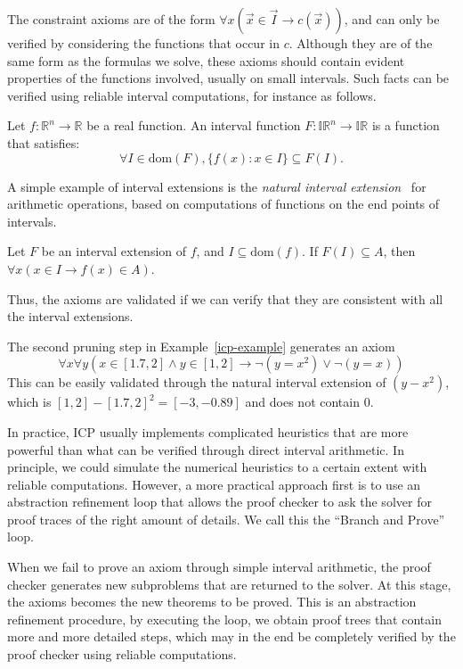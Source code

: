 \documentclass[envcountsect]{llncs}
\newcommand{\dom}{\mathrm{dom}}
\begin{document}
The constraint axioms are of the form $\forall x (\vec x\in \vec I \rightarrow
c(\vec x))$, and can only be verified by considering the functions that
occur in $c$. Although they are of the same form as the formulas we solve,
these axioms should contain evident properties of the functions involved,
usually on small intervals. Such facts can be verified using reliable interval
computations, for instance as follows. 
\begin{definition}
Let $f: \mathbb{R}^n\rightarrow \mathbb{R}$ be a real function. An interval
function $F: \mathbb{IR}^n \rightarrow \mathbb{IR}$ is a function that
satisfies:
$$\forall I\in \dom(F), \{f(x): x\in I\}\subseteq F(I).$$
\end{definition}
A simple example of interval extensions is the {\em natural interval
extension}~\cite{} for
arithmetic operations, based on computations of functions on the end points of 
intervals. 

\begin{proposition}
Let $F$ be an interval extension of $f$, and $I\subseteq \dom(f)$. If
$F(I)\subseteq A$, then $\forall x (x\in I \rightarrow f(x)\in A)$.
\end{proposition}
Thus, the axioms are validated if we can verify that they are consistent with
all the interval extensions. 
\begin{example}
The second pruning step in Example~\ref{icp-example} generates an axiom 
$$\forall
x \forall y ( x\in [1.7, 2] \wedge y\in [1, 2] \rightarrow \neg (y=
x^2)\vee \neg (y=x))$$
This can be easily validated through the natural interval extension of
$(y-x^2)$, which is $[1,2]-[1.7,2]^2 = [-3, -0.89]$ and does not contain $0$. 
\end{example}

In practice, ICP usually implements complicated heuristics that are more
powerful than what can be verified through direct interval arithmetic. In
principle, we could simulate the numerical heuristics to a certain extent with
reliable computations. However, a more practical approach first is to use an
abstraction refinement loop that allows the proof checker to ask the
solver for proof traces of the right amount of details. We call this the
``Branch and Prove'' loop. 
 
 When we fail to prove an axiom through simple interval arithmetic, the proof
checker generates new subproblems that are returned to the solver. At this
stage, the axioms becomes the new theorems to be proved. 
This is an abstraction refinement procedure, by executing the loop, we obtain
proof trees that contain more and more detailed steps, which may in the end be
completely verified by the proof checker using reliable computations. 
\end{document}
